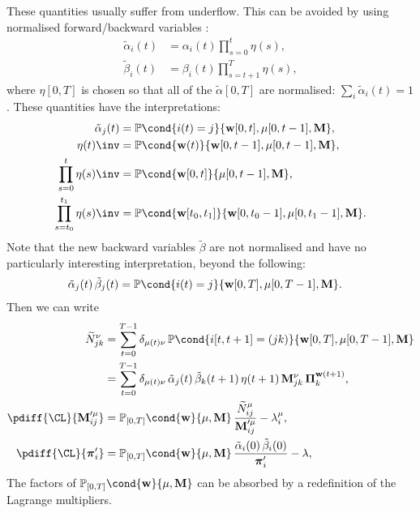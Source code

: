 \documentclass[12pt]{article}
\newcommand{\pib}{\boldsymbol{\pi}}
\newcommand{\Pib}{\boldsymbol{\Pi}}
\newcommand{\w}{\mathbf{w}}
\newcommand{\M}{\mathbf{M}}
\newcommand{\pr}{\mathbb{P}}
\begin{document}
These quantities usually suffer from underflow.
This can be avoided by using normalised forward/backward variables \cite{Zhai2003HMMnorm}:
%
\begin{equation}\label{eq:normalphabeta}
\begin{aligned}
  \tilde{\alpha}_i(t) &= \alpha_i(t) \prod_{s=0}^{t} \eta(s), \\
  \tilde{\beta}_i(t) &= \beta_i(t) \prod_{s=t+1}^{T} \eta(s),
\end{aligned}
\end{equation}
%
where $\eta[0,T]$ is chosen so that all of the $\tilde{\alpha}[0,T]$ are normalised: $\sum_i \tilde{\alpha}_i(t) = 1$.
These quantities have the interpretations:
%
\begin{equation}\label{eq:normintepr}
\begin{aligned}
  \tilde{\alpha}_j(t) &= \pr\cond{i(t)=j}{\w[0,t],\mu[0,t-1],\M}, \\
  \eta(t)\inv &= \pr\cond{\w(t)}{\w[0,t-1],\mu[0,t-1],\M}, \\
  \prod_{s=0}^t \eta(s)\inv &= \pr\cond{\w[0,t]}{\mu[0,t-1],\M}, \\
  \prod_{s=t_0}^{t_1} \eta(s)\inv &= 
          \pr\cond{\w[t_0,t_1]}{\w[0,t_0-1],\mu[0,t_1-1],\M}.
\end{aligned}
\end{equation}
%
Note that the new backward variables $\tilde{\beta}$ are not normalised and have no particularly interesting interpretation, beyond the following:
%
\begin{equation}\label{eq:normstateprob}
\begin{aligned}
  \tilde{\alpha}_j(t) \, \tilde{\beta}_j(t) &= \pr\cond{i(t)=j}{\w[0,T],\mu[0,T-1],\M}.
\end{aligned}
\end{equation}
%
Then we can write
%
\begin{equation}\label{eq:singlediffsnorm}
\begin{aligned}
  \widetilde{N}^\nu_{jk} &= \sum_{t=0}^{T-1} \delta_{\mu(t)\nu} \, 
      \pr\cond{i[t,t+1]=(jk)}{\w[0,T],\mu[0,T-1],\M} \\
     &= \sum_{t=0}^{T-1} \delta_{\mu(t)\nu} \, 
      \tilde{\alpha}_j(t) \, \tilde{\beta}_k(t+1) \, \eta(t+1) \, 
      \M^{\nu}_{jk} \, \Pib_k^{\w(t+1)} ,\\
  \pdiff{\CL}{\M'^\mu_{ij}} &= \pr_{[0,T]}\cond{\w}{\mu,\M} \, 
      \frac{ \widetilde{N}^\mu_{ij} }{ \M'^\mu_{ij} } - \lambda^\mu_{i}, \\
  \pdiff{\CL}{\pib'_{i}} &= \pr_{[0,T]}\cond{\w}{\mu,\M} \, 
      \frac{ \tilde{\alpha}_i(0) \, \tilde{\beta}_i(0) }{ \pib'_{i} } - \lambda,
\end{aligned}
\end{equation}
%
The factors of $\pr_{[0,T]}\cond{\w}{\mu,\M}$ can be absorbed by a redefinition of the Lagrange multipliers.
\end{document}
